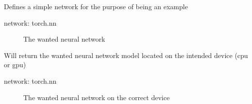 \documentclass[letterpaper,10pt,english]{sphinxmanual}
\begin{document}
\begin{fulllineitems}
\begin{fulllineitems}
\begin{description}
\end{description}

\end{fulllineitems}


\begin{fulllineitems}
\label{\detokenize{MultiAgentMarketRL:network_models.SimpleExampleNetwork.define_network}}
\sphinxAtStartPar
Defines a simple network for the purpose of being an example
\begin{description}
\item[{network: torch.nn}] \leavevmode
\sphinxAtStartPar
The wanted neural network

\end{description}

\end{fulllineitems}


\begin{fulllineitems}
\label{\detokenize{MultiAgentMarketRL:network_models.SimpleExampleNetwork.get_network}}
\sphinxAtStartPar
Will return the wanted neural network model located on the intended device (cpu or gpu)
\begin{description}
\item[{network: torch.nn}] \leavevmode
\sphinxAtStartPar
The wanted neural network on the correct device

\end{description}

\end{fulllineitems}


\end{fulllineitems}

\label{\detokenize{MultiAgentMarketRL:module-info_setting}}
\end{document}
